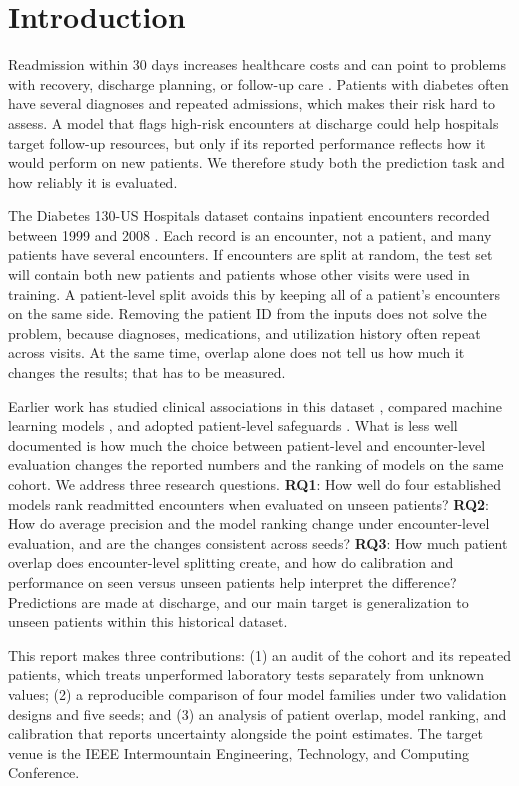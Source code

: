 \documentclass[conference]{IEEEtran}
\begin{document}
\section{Introduction}
Readmission within 30 days increases healthcare costs and can point to problems with recovery, discharge planning, or follow-up care \cite{emi}. Patients with diabetes often have several diagnoses and repeated admissions, which makes their risk hard to assess. A model that flags high-risk encounters at discharge could help hospitals target follow-up resources, but only if its reported performance reflects how it would perform on new patients. We therefore study both the prediction task and how reliably it is evaluated.

The Diabetes 130-US Hospitals dataset contains inpatient encounters recorded between 1999 and 2008 \cite{uci,strack}. Each record is an encounter, not a patient, and many patients have several encounters. If encounters are split at random, the test set will contain both new patients and patients whose other visits were used in training. A patient-level split avoids this by keeping all of a patient's encounters on the same side. Removing the patient ID from the inputs does not solve the problem, because diagnoses, medications, and utilization history often repeat across visits. At the same time, overlap alone does not tell us how much it changes the results; that has to be measured.

Earlier work has studied clinical associations in this dataset \cite{strack}, compared machine learning models \cite{emi}, and adopted patient-level safeguards \cite{afridi}. What is less well documented is how much the choice between patient-level and encounter-level evaluation changes the reported numbers and the ranking of models on the same cohort. We address three research questions. \textbf{RQ1}: How well do four established models rank readmitted encounters when evaluated on unseen patients? \textbf{RQ2}: How do average precision and the model ranking change under encounter-level evaluation, and are the changes consistent across seeds? \textbf{RQ3}: How much patient overlap does encounter-level splitting create, and how do calibration and performance on seen versus unseen patients help interpret the difference? Predictions are made at discharge, and our main target is generalization to unseen patients within this historical dataset.

This report makes three contributions: (1) an audit of the cohort and its repeated patients, which treats unperformed laboratory tests separately from unknown values; (2) a reproducible comparison of four model families under two validation designs and five seeds; and (3) an analysis of patient overlap, model ranking, and calibration that reports uncertainty alongside the point estimates. The target venue is the IEEE Intermountain Engineering, Technology, and Computing Conference.
\end{document}
